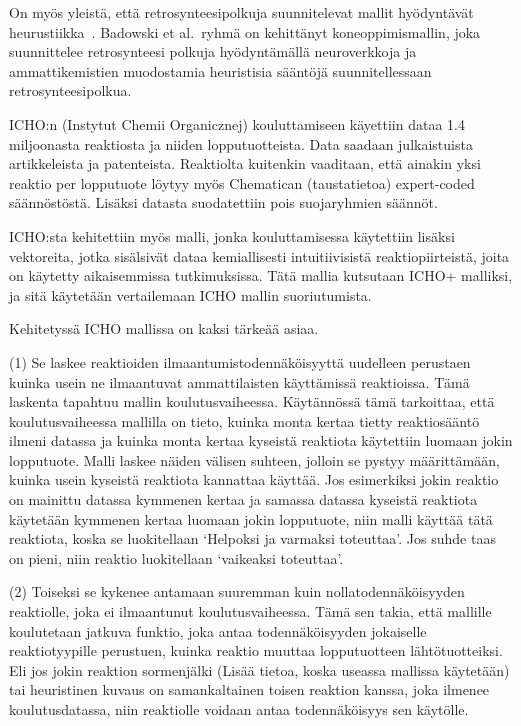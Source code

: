 \documentclass[finnish,twoside,censored,tkt,sw-line]{HYthesisML}
\begin{document}
On myös yleistä, että retrosynteesipolkuja suunnitelevat mallit hyödyntävät heurustiikka~\cite{ExpertKnowledgeRetorsynthesis}.
Badowski et al.\ ryhmä on kehittänyt koneoppimismallin, joka suunnittelee retrosynteesi polkuja hyödyntämällä neuroverkkoja ja ammattikemistien muodostamia heuristisia sääntöjä suunnitellessaan retrosynteesipolkua.

ICHO:n (Instytut Chemii Organicznej) kouluttamiseen käyettiin dataa 1.4 miljoonasta reaktiosta ja niiden lopputuotteista.
Data saadaan julkaistuista artikkeleista ja patenteista.
Reaktiolta kuitenkin vaaditaan, että ainakin yksi reaktio per lopputuote löytyy myös Chematican (taustatietoa) expert-coded säännöstöstä.
Lisäksi datasta suodatettiin pois suojaryhmien säännöt.

ICHO:sta kehitettiin myös malli, jonka kouluttamisessa käytettiin lisäksi vektoreita, jotka sisälsivät dataa kemiallisesti intuitiivisistä reaktiopiirteistä, joita on käytetty aikaisemmissa tutkimuksissa.
Tätä mallia kutsutaan ICHO+ malliksi, ja sitä käytetään vertailemaan ICHO mallin suoriutumista.

Kehitetyssä ICHO mallissa on kaksi tärkeää asiaa.

(1) Se laskee reaktioiden ilmaantumistodennäköisyyttä uudelleen perustaen kuinka usein ne ilmaantuvat ammattilaisten käyttämissä reaktioissa.
Tämä laskenta tapahtuu mallin koulutusvaiheessa.
Käytännössä tämä tarkoittaa, että koulutusvaiheessa mallilla on tieto, kuinka monta kertaa tietty reaktiosääntö ilmeni datassa ja kuinka monta kertaa kyseistä reaktiota käytettiin luomaan jokin lopputuote.
Malli laskee näiden välisen suhteen, jolloin se pystyy määrittämään, kuinka usein kyseistä reaktiota kannattaa käyttää.
Jos esimerkiksi jokin reaktio on mainittu datassa kymmenen kertaa ja samassa datassa kyseistä reaktiota käytetään kymmenen kertaa luomaan jokin lopputuote, niin malli käyttää tätä reaktiota, koska se luokitellaan `Helpoksi ja varmaksi toteuttaa'.
Jos suhde taas on pieni, niin reaktio luokitellaan `vaikeaksi toteuttaa'.

(2) Toiseksi se kykenee antamaan suuremman kuin nollatodennäköisyyden reaktiolle, joka ei ilmaantunut koulutusvaiheessa.
Tämä sen takia, että mallille koulutetaan jatkuva funktio, joka antaa todennäköisyyden jokaiselle reaktiotyypille perustuen, kuinka reaktio muuttaa lopputuotteen lähtötuotteiksi.
Eli jos jokin reaktion sormenjälki (Lisää tietoa, koska useassa mallissa käytetään) tai heuristinen kuvaus on samankaltainen toisen reaktion kanssa, joka ilmenee koulutusdatassa, niin reaktiolle voidaan antaa todennäköisyys sen käytölle.
\end{document}
